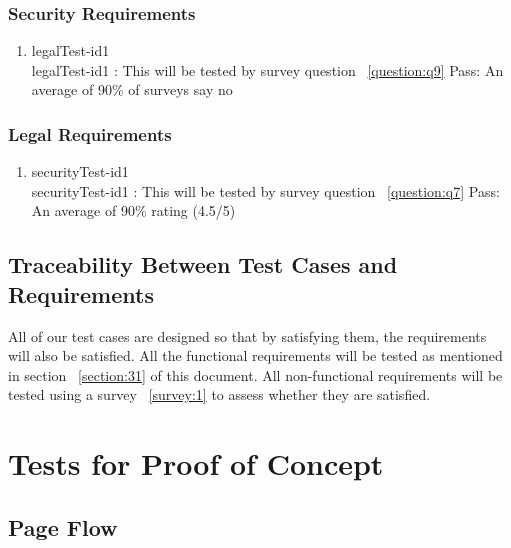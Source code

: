 \documentclass[12pt, titlepage]{article}
\begin{document}
\subsubsection{Security Requirements}
\begin{enumerate}
\item{legalTest-id1\\}
legalTest-id1 : This will be tested by survey question ~\ref{question:q9}
\newline
	Pass: An average of 90\% of surveys say no

\end{enumerate}

\subsubsection{ Legal Requirements}
\begin{enumerate}
\item{securityTest-id1\\}
securityTest-id1 : This will be tested by survey question ~\ref{question:q7}
\newline
	Pass: An average of 90\% rating (4.5/5)


\end{enumerate}

\subsection{Traceability Between Test Cases and Requirements}
All of our test cases are designed so that by satisfying them, the requirements will also be satisfied. All the functional requirements will be tested as mentioned in section ~\ref{section:31} of this document. All non-functional requirements will be tested using a survey ~\ref{survey:1} to assess whether they are satisfied.

\section{Tests for Proof of Concept}

\subsection{Page Flow}
\end{document}
